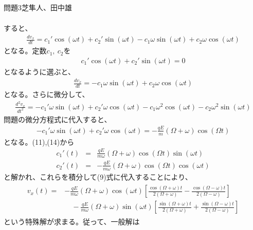 \documentclass[fleqn]{jbook}
\begin{document}
\begin{answer}{問題3}{芝隼人、田中雄}
\begin{enumerate}
\begin{eqnarray}
					  \end{eqnarray}
					  すると、
					  \begin{eqnarray}
					  \frac{dv_x}{dt} = c_1' \cos (\omega t) +c_2' \sin (\omega t) - c_1 \omega \sin (\omega t) +c_2 \omega \cos (\omega t)
					  \end{eqnarray}
					  となる。定数$c_1,\ c_2$を
					  \begin{eqnarray}
					  c_1' \cos (\omega t) +c_2' \sin (\omega t)=0
					  \end{eqnarray}
					  となるように選ぶと、
					  \begin{eqnarray}
					  \frac{dv_x}{dt} = -c_1\omega \sin (\omega t) +c_2\omega \cos (\omega t)
					  \end{eqnarray}
					  となる。さらに微分して、
					  \begin{eqnarray}
					  \frac{d^2 v_x}{dt^2} = -c_1' \omega\sin (\omega t) + c_2' \omega \cos (\omega t)-c_1 \omega^2 \cos (\omega t) -c_2 \omega^2 \sin(\omega t)
					  \end{eqnarray}
					  問題の微分方程式に代入すると、
					  \begin{eqnarray}
					  -c_1' \omega \sin (\omega t) +c_2' \omega\cos (\omega t) = -\frac{qE}{m}\left( \Omega +\omega\right) \cos (\Omega t)
					  \end{eqnarray}
					  となる。(11),(14)から
					  \begin{eqnarray}
					  c_1'(t) &=& \frac{qE}{m\omega}(\Omega +\omega )\cos (\Omega t)\sin (\omega t) \\
					  c_2'(t) &=& -\frac{qE}{m\omega}(\Omega +\omega )\cos (\Omega t)\cos (\omega t)
					  \end{eqnarray}
					  と解かれ、これらを積分して(9)式に代入することにより、
					  \begin{eqnarray}
					  \begin{array}{rl}{}
					  v_x(t) = & -\displaystyle\frac{qE}{m\omega}(\Omega +\omega)\cos(\omega t) \left[ \frac{\cos (\Omega +\omega )t}{2(\Omega +\omega )}-\frac{\cos (\Omega -\omega )t}{2(\Omega -\omega )}\right] \\
 					  & \quad - \displaystyle\frac{qE}{m\omega} (\Omega +\omega )\sin (\omega t)\left[ \frac{\sin (\Omega +\omega )t}{2(\Omega +\omega)}+\frac{\sin (\Omega -\omega )t}{2(\Omega -\omega)}\right]
					  \end{array}
					  \end{eqnarray}
					  という特殊解が求まる。従って、一般解は
					  \begin{eqnarray}
					  \begin{array}{rl}{}

\end{array}
\end{eqnarray}
\end{enumerate}
\end{answer}
\end{document}
